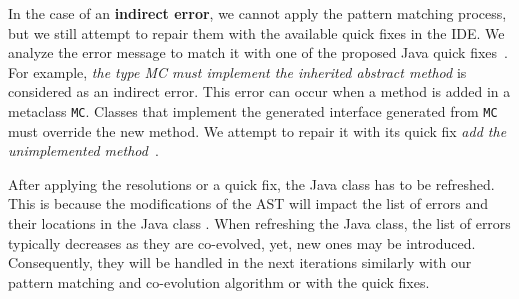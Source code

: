 In the case of an \textbf{indirect error}, we cannot apply the pattern matching process, but we still attempt to repair them with the available quick fixes in the IDE. 
%
%
We analyze the error message to match it with one of the proposed Java quick fixes~{\small{}}. For example, \emph{the type MC must implement the inherited abstract method} is considered as an indirect error. 
This error can occur when a method is added in a metaclass \texttt{MC}. Classes that implement the generated interface generated from \texttt{MC} must override the new method.
We attempt to repair it with its quick fix \emph{add the unimplemented method}~{\small{}}.

After applying the resolutions or a quick fix, the Java class has to be refreshed. This is because the modifications of the AST will impact the list of errors and their locations in the Java class {\small{}}. When 
refreshing the Java class, the list of errors typically decreases as they are co-evolved,  
yet, new ones may be introduced. Consequently, they will be handled in the next iterations similarly with our pattern matching and co-evolution algorithm or with the quick fixes.

